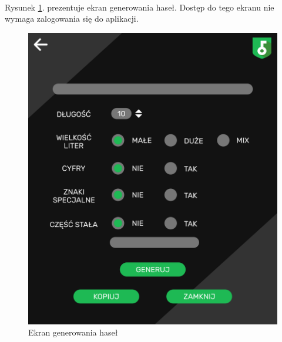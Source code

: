 \documentclass[a4paper]{article}
\begin{document}
\newpage

\paragraph{}Rysunek \ref{fig:generuj}. prezentuje ekran generowania haseł. Dostęp do tego ekranu nie wymaga zalogowania się do aplikacji.
\begin{figure}[H]
    \centering
    \includegraphics[height=1\textwidth]{img/ekran_generowania.png}
    \caption{Ekran generowania haseł}
    \label{fig:generuj}
\end{figure}

\newpage
\end{document}
